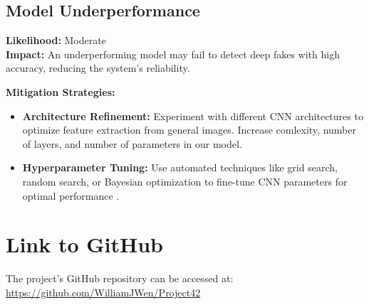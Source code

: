 \documentclass{article} %
\begin{document}
\subsection{Model Underperformance}
\textbf{Likelihood:} Moderate \\
\textbf{Impact:} An underperforming model may fail to detect deep fakes with high accuracy, reducing the system's reliability.

\textbf{Mitigation Strategies:}
\begin{itemize}
    \item \textbf{Architecture Refinement:} Experiment with different CNN architectures to optimize feature extraction from general images. Increase comlexity, number of layers, and number of parameters in our model.
    \item \textbf{Hyperparameter Tuning:} Use automated techniques like grid search, random search, or Bayesian optimization to fine-tune CNN parameters for optimal performance \citep{bergstra2011}.
\end{itemize}

\section{Link to GitHub}
The project's GitHub repository can be accessed at:  
\href{https://github.com/WilliamJWen/Project42}{https://github.com/WilliamJWen/Project42}


\label{last_page}



\end{document}
